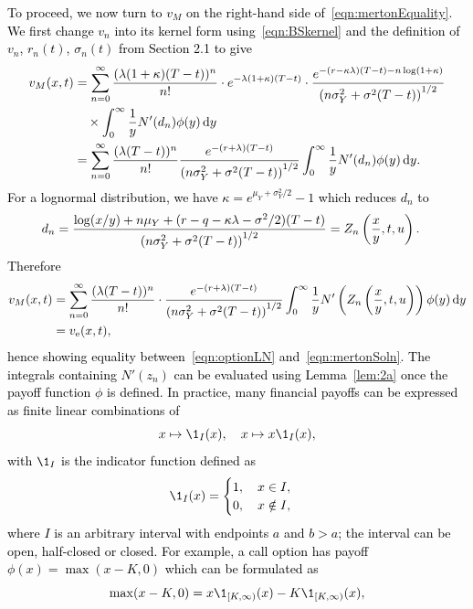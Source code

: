 \textcolor{black}{
To proceed, we now turn to $v_M$ on the right-hand side of~\eqref{eqn:mertonEquality}. We first change $v_n$ into its kernel form using~\eqref{eqn:BSkernel} and the definition of $v_n$, $r_n(t)$, $\sigma_n(t)$ from Section 2.1 to give
	\begin{align*}
		v_M(x,t) &=  \displaystyle\sum\limits_{n=0}^\infty\frac{(\lambda(1+\kappa)(T-t))^n}{n!}\cdot e^{-\lambda(1+\kappa)(T-t)}\cdot \frac{e^{-(r-\kappa\lambda)(T-t)-n\log(1+\kappa)}}{\left(n\sigma_Y^2 + \sigma^2(T-t)\right)^{1/2}} \\
		& \quad {} \times \int_0^\infty \frac{1}{y}N'(d_n) \phi(y) \, \mathrm d y \\
		&= \displaystyle\sum\limits_{n=0}^\infty\frac{(\lambda(T-t))^n}{n!}\frac{e^{-(r+\lambda)(T-t)}}{\left(n\sigma_Y^2 + \sigma^2(T-t)\right)^{1/2}}\int_0^\infty \frac{1}{y}N'(d_n) \phi(y) \, \mathrm d y.
	\end{align*}
For a lognormal distribution, we have $\kappa = e^{\mu_Y + \sigma_Y^2/2} - 1$ which reduces $d_n$ to
	\begin{align*}
		d_n &= \frac{\log(x/y) + n\mu_Y + (r - q - \kappa\lambda - \sigma^2/2)(T-t)}{\left( n\sigma_Y^2 + \sigma^2(T-t) \right)^{1/2}} = Z_n\left(\frac{x}{y},t,u\right).
	\end{align*}
Therefore
	\begin{align*}
		v_M(x,t) &=  \displaystyle\sum\limits_{n=0}^\infty\frac{(\lambda(T-t))^n}{n!}\cdot\frac{e^{-(r+\lambda)(T-t)}}{\left(n\sigma_Y^2 + \sigma^2(T-t)\right)^{1/2}}\int_0^\infty \frac{1}{y}N'\left(Z_n\left( \frac{x}{y},t,u \right)\right) \phi(y) \, \mathrm d y \\
		 &= v_\text{e}(x,t),
	\end{align*}
hence showing equality between~\eqref{eqn:optionLN} and~\eqref{eqn:mertonSoln}. The integrals containing $N'(z_n)$ can be evaluated using Lemma~\ref{lem:2a} once the payoff function $\phi$ is defined. In practice, \textcolor{black}{many} financial payoffs can be expressed as finite linear combinations of
	$$
		x \mapsto \1_{I}(x), \quad x \mapsto x\1_{I}(x),
	$$
with $\1_I$ is the indicator function defined as
	$$
		\1_I(x) = \begin{cases}
			1, \quad x \in I, \\
			0, \quad x \notin I,
		\end{cases}
	$$
where $I$ is an arbitrary interval with endpoints $a$ and $b > a$; the interval can be open, half-closed or closed. For example, a call option has payoff $\phi(x) = \max(x-K,0)$ which can be formulated as
	$$
		\max(x-K,0) = x\1_{[K,\infty)}(x) - K\1_{[K,\infty)}(x),
	$$
}
